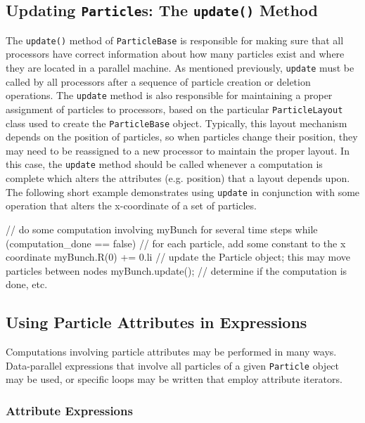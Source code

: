 \subsection{Updating \texttt{Particle}s: The \texttt{update()} Method}

The \texttt{update()} method of \texttt{ParticleBase} is responsible for making sure that all processors have correct information about how many particles exist and where they are located in a parallel machine. As mentioned previously, \texttt{update} must be called by all processors after a sequence of particle creation or deletion operations. The \texttt{update} method is also responsible for maintaining a proper assignment of particles to processors, based on the particular
\texttt{ParticleLayout} class used to create the
\texttt{ParticleBase} object. Typically, this layout mechanism depends on the position of particles, so when particles change their position, they may need to be reassigned to a new processor to maintain the proper layout. In this case, the \texttt{update} method should be called whenever a computation is complete which alters the attributes (e.g. position) that a layout depends upon. The following short example demonstrates using \texttt{update} in conjunction with some operation that alters the x-coordinate of a
set of particles. \\
\begin{code}
// do some computation involving myBunch for several time steps 
while (computation_done == false) { 
    // for each particle, add some constant to the x coordinate 
    myBunch.R(0) += 0.li 
    // update the Particle object; this may move particles between nodes 
    myBunch.update(); 
    // determine if the computation is done, etc.
}
\end{code}

\subsection{Using Particle Attributes in Expressions}

Computations involving particle attributes may be performed in many ways. Data-parallel expressions that involve all particles of a given \texttt{Particle} object may be used, or specific loops may be written that employ attribute iterators.


\subsubsection{Attribute Expressions}

